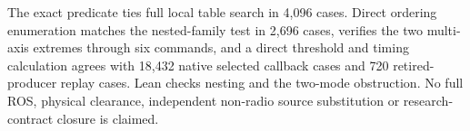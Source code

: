 \documentclass{article}
\begin{document}
The exact predicate ties full local table search in 4,096 cases. Direct ordering enumeration matches the nested-family test in 2,696 cases, verifies the two multi-axis extremes through six commands, and a direct threshold and timing calculation agrees with 18,432 native selected callback cases and 720 retired-producer replay cases. Lean checks nesting and the two-mode obstruction. No full ROS, physical clearance, independent non-radio source substitution or research-contract closure is claimed.
\end{document}
